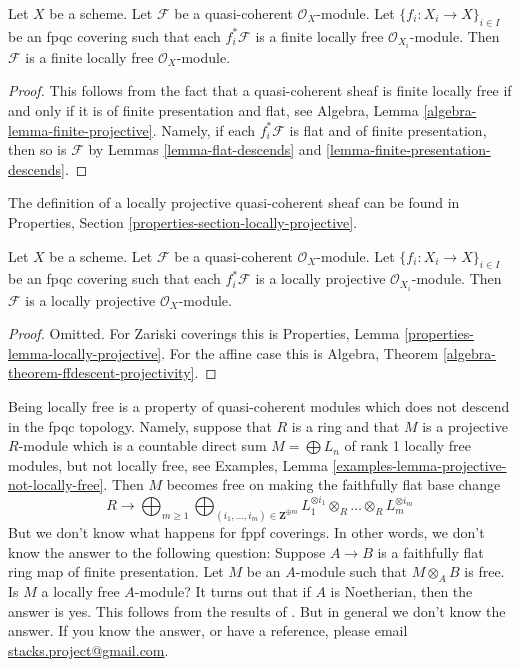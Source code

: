 \begin{lemma}
\label{lemma-finite-locally-free-descends}
Let $X$ be a scheme.
Let $\mathcal{F}$ be a quasi-coherent $\mathcal{O}_X$-module.
Let $\{f_i : X_i \to X\}_{i \in I}$ be an fpqc covering such that
each $f_i^*\mathcal{F}$ is a finite locally free $\mathcal{O}_{X_i}$-module.
Then $\mathcal{F}$ is a finite locally free $\mathcal{O}_X$-module.
\end{lemma}

\begin{proof}
This follows from the fact that a quasi-coherent sheaf is finite locally
free if and only if it is of finite presentation and flat, see
Algebra, Lemma \ref{algebra-lemma-finite-projective}.
Namely, if each $f_i^*\mathcal{F}$ is flat and of finite presentation,
then so is $\mathcal{F}$ by
Lemmas \ref{lemma-flat-descends} and
\ref{lemma-finite-presentation-descends}.
\end{proof}

\noindent
The definition of a locally projective quasi-coherent sheaf can be found in
Properties, Section \ref{properties-section-locally-projective}.

\begin{lemma}
\label{lemma-locally-projective-descends}
Let $X$ be a scheme.
Let $\mathcal{F}$ be a quasi-coherent $\mathcal{O}_X$-module.
Let $\{f_i : X_i \to X\}_{i \in I}$ be an fpqc covering such that
each $f_i^*\mathcal{F}$ is a locally projective $\mathcal{O}_{X_i}$-module.
Then $\mathcal{F}$ is a locally projective $\mathcal{O}_X$-module.
\end{lemma}

\begin{proof}
Omitted. For Zariski coverings this is
Properties, Lemma \ref{properties-lemma-locally-projective}.
For the affine case this is
Algebra, Theorem \ref{algebra-theorem-ffdescent-projectivity}.
\end{proof}

\begin{remark}
\label{remark-locally-free-descends}
Being locally free is a property of quasi-coherent modules which
does not descend in the fpqc topology. Namely, suppose that
$R$ is a ring and that $M$ is a projective $R$-module which is
a countable direct sum $M = \bigoplus L_n$ of rank 1 locally
free modules, but not locally free, see
Examples, Lemma \ref{examples-lemma-projective-not-locally-free}.
Then $M$ becomes free on making the faithfully flat base change
$$
R \longrightarrow
\bigoplus\nolimits_{m \geq 1}
\bigoplus\nolimits_{(i_1, \ldots, i_m) \in \mathbf{Z}^{\oplus m}}
L_1^{\otimes i_1} \otimes_R \ldots \otimes_R L_m^{\otimes i_m}
$$
But we don't know what happens for fppf coverings. In other words,
we don't know the answer to the following question:
Suppose $A \to B$ is a faithfully
flat ring map of finite presentation. Let $M$ be an $A$-module
such that $M \otimes_A B$ is free. Is $M$ a locally free
$A$-module? It turns out that if $A$ is Noetherian, then the answer
is yes. This follows from the results of \cite{Bass}. But in general
we don't know the answer. If you know the answer, or have a reference,
please email
\href{mailto:stacks.project@gmail.com}{stacks.project@gmail.com}.
\end{remark}

